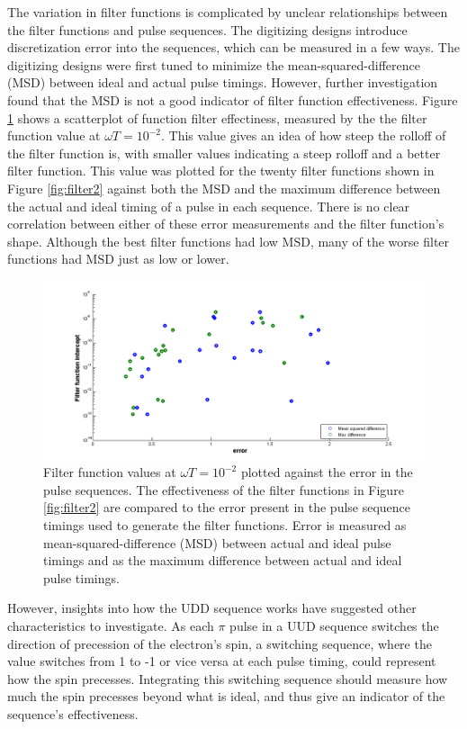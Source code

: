 \documentclass[pdftex,12pt,a4paper]{article}
\begin{document}
The variation in filter functions is complicated by unclear relationships between the filter functions and pulse sequences. The digitizing designs introduce discretization error into the sequences, which can be measured in a few ways. The digitizing designs were first tuned to minimize the mean-squared-difference (MSD) between ideal and actual pulse timings. However, further investigation found that the MSD is not a good indicator of filter function effectiveness. Figure \ref{fig:filter3} shows a scatterplot of function filter effectiness, measured by the the filter function value at $\omega T = 10^{-2}$. This value gives an idea of how steep the rolloff of the filter function is, with smaller values indicating a steep rolloff and a better filter function. This value was plotted for the twenty filter functions shown in Figure \ref{fig:filter2} against both the MSD and the maximum difference between the actual and ideal timing of a pulse in each sequence. There is no clear correlation between either of these error measurements and the filter function's shape. Although the best filter functions had low MSD, many of the worse filter functions had MSD just as low or lower.

\begin{figure}[H]
  \centering
    \includegraphics[width=\textwidth]{erroranalysis2.png}
  \caption{Filter function values at $\omega T=10^{-2}$ plotted against the error in the pulse sequences. The effectiveness of the filter functions in Figure \ref{fig:filter2} are compared to the error present in the pulse sequence timings used to generate the filter functions. Error is measured as mean-squared-difference (MSD) between actual and ideal pulse timings and as the maximum difference between actual and ideal pulse timings.}
  \label{fig:filter3}
\end{figure}

However, insights into how the UDD sequence works have suggested other characteristics to investigate. As each $\pi$ pulse in a UUD sequence switches the direction of precession of the electron's spin, a switching sequence, where the value switches from 1 to -1 or vice versa at each pulse timing, could represent how the spin precesses\cite{west_near-optimal_2010}. Integrating this switching sequence should measure how much the spin precesses beyond what is ideal, and thus give an indicator of the sequence's effectiveness. 
\end{document}
